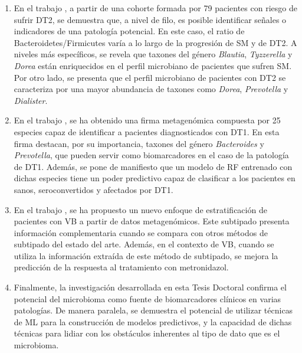 \begin{enumerate}

\item En el trabajo \cite{paper1}, a partir de una cohorte formada por 79 pacientes con riesgo de sufrir DT2, se demuestra que, a nivel de filo, es posible identificar señales o indicadores de una patología potencial. En este caso, el ratio de Bacteroidetes/Firmicutes varía a lo largo de la progresión de SM y de DT2. A niveles más específicos, se revela que taxones del género \textit{Blautia}, \textit{Tyzzerella} y \textit{Dorea} están enriquecidos en el perfil microbiano de pacientes que sufren SM. Por otro lado, se presenta que el perfil microbiano de pacientes con DT2 se caracteriza por una mayor abundancia de taxones como \textit{Dorea}, \textit{Prevotella} y \textit{Dialister}.

\item En el trabajo \cite{paper2}, se ha obtenido una firma metagenómica compuesta por 25 especies capaz de identificar a pacientes diagnosticados con DT1. En esta firma destacan, por su importancia, taxones del género \textit{Bacteroides} y \textit{Prevotella}, que pueden servir como biomarcadores en el caso de la patología de DT1. Además, se pone de manifiesto que un modelo de RF entrenado con dichas especies tiene un poder predictivo capaz de clasificar a los pacientes en sanos, seroconvertidos y afectados por DT1.

\item En el trabajo \cite{paper3}, se ha propuesto un nuevo enfoque de estratificación de pacientes con VB a partir de datos metagenómicos. Este subtipado presenta información complementaria cuando se compara con otros métodos de subtipado del estado del arte. Además, en el contexto de VB, cuando se utiliza la información extraída de este método de subtipado, se mejora la predicción de la respuesta al tratamiento con metronidazol.

\item Finalmente, la investigación desarrollada en esta Tesis Doctoral confirma el potencial del microbioma como fuente de biomarcadores clínicos en varias patologías. De manera paralela, se demuestra el potencial de utilizar técnicas de ML para la construcción de modelos predictivos, y la capacidad de dichas técnicas para lidiar con los obstáculos inherentes al tipo de dato que es el microbioma.

\end{enumerate}